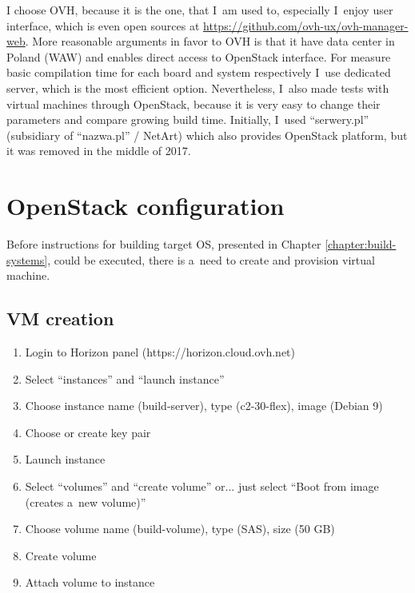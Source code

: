 \documentclass[printmode]{mgr}
\begin{document}
I choose OVH, because it is the one, that I~am used to, especially I~enjoy user interface, which is even open sources at \url{https://github.com/ovh-ux/ovh-manager-web}.
More reasonable arguments in favor to OVH is that it have data center in Poland (WAW) and enables direct access to OpenStack interface.
For measure basic compilation time for each board and system respectively I~use dedicated server, which is the most efficient option.
Nevertheless, I~also made tests with virtual machines through OpenStack, because it is very easy to change their parameters and compare growing build time.
Initially, I~used ``serwery.pl'' (subsidiary of ``nazwa.pl'' / NetArt) which also provides OpenStack platform, but it was removed in the middle of 2017.


\section{OpenStack configuration}

Before instructions for building target OS, presented in Chapter \ref{chapter:build-systems}, could be executed, there is a~need to create and provision virtual machine.





\subsection*{VM creation}

\begin{enumerate}
  \item Login to Horizon panel (https://horizon.cloud.ovh.net)
  \item Select ``instances'' and ``launch instance''
  \item Choose instance name (build-server), type (c2-30-flex), image (Debian 9)
  \item Choose or create key pair
  \item Launch instance
  \item Select ``volumes'' and ``create volume'' or... just select ``Boot from image (creates a~new volume)'' 
  \item Choose volume name (build-volume), type (SAS), size (50 GB)
  \item Create volume
  \item Attach volume to instance
\end{enumerate}
\end{document}
